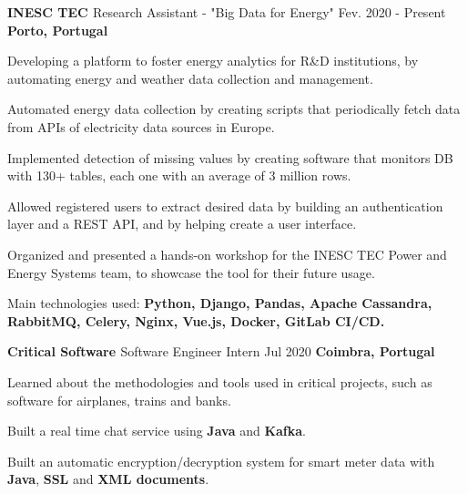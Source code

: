 

\begin{cventries}

  \cventry
    {\textbf{INESC TEC \href{https://www.inesctec.pt/en}{\faExternalLink}}} %
    {Research Assistant - "Big Data for Energy"} %
    {Fev. 2020 - Present} %
    {\textbf{Porto, Portugal}} %
    {
      \begin{cvitems} %
        \item {Developing a platform to foster energy analytics for R\&D institutions, by automating energy and weather data collection and management.}
        \item {Automated energy data collection by creating scripts that periodically fetch data from APIs of electricity data sources in Europe.}
        \item {Implemented detection of missing values by creating software that monitors DB with 130+ tables, each one with an average of 3 million rows.}
        \item {Allowed registered users to extract desired data by building an authentication layer and a REST API, and by helping create a user interface.}
        \item {Organized and presented a hands-on workshop for the INESC TEC Power and Energy Systems team, to showcase the tool for their future usage.}
        \item {Main technologies used: \textbf{Python, Django, Pandas, Apache Cassandra, RabbitMQ, Celery, Nginx, Vue.js, Docker, GitLab CI/CD.}}
      \end{cvitems}
    }

  \cventry
    {\textbf{Critical Software \href{https://www.criticalsoftware.com/en}{\faExternalLink}}} %
    {Software Engineer Intern} %
    {Jul 2020} %
    {\textbf{Coimbra, Portugal}} %
    {
      \begin{cvitems} %
        \item {Learned about the methodologies and tools used in critical projects, such as software for airplanes, trains and banks.}
        \item {Built a real time chat service using \textbf{Java} and \textbf{Kafka}.}
        \item {Built an automatic encryption/decryption system for smart meter data with \textbf{Java}, \textbf{SSL} and \textbf{XML documents}.}
      \end{cvitems}
    }
    

\end{cventries}
